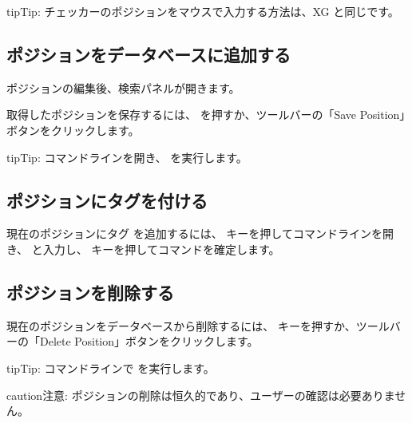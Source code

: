 \documentclass[letterpaper,10pt,dvipdfmx]{sphinxmanual}
\begin{document}
\begin{sphinxadmonition}{tip}{Tip:}
\sphinxAtStartPar
チェッカーのポジションをマウスで入力する方法は、XG と同じです。
\end{sphinxadmonition}


\subsection{ポジションをデータベースに追加する}
\label{\detokenize{guide_utilisateur:ajouter-une-position-a-la-base-de-donnees}}
\sphinxAtStartPar
ポジションの編集後、検索パネルが開きます。

\sphinxAtStartPar
取得したポジションを保存するには、 を押すか、ツールバーの「Save Position」ボタンをクリックします。

\begin{sphinxadmonition}{tip}{Tip:}
\sphinxAtStartPar
コマンドラインを開き、 を実行します。
\end{sphinxadmonition}


\subsection{ポジションにタグを付ける}
\label{\detokenize{guide_utilisateur:etiqueter-une-position}}
\sphinxAtStartPar
現在のポジションにタグ  を追加するには、 キーを押してコマンドラインを開き、 と入力し、 キーを押してコマンドを確定します。


\subsection{ポジションを削除する}
\label{\detokenize{guide_utilisateur:supprimer-une-position}}
\sphinxAtStartPar
現在のポジションをデータベースから削除するには、 キーを押すか、ツールバーの「Delete Position」ボタンをクリックします。

\begin{sphinxadmonition}{tip}{Tip:}
\sphinxAtStartPar
コマンドラインで  を実行します。
\end{sphinxadmonition}

\begin{sphinxadmonition}{caution}{注意:}
\sphinxAtStartPar
ポジションの削除は恒久的であり、ユーザーの確認は必要ありません。
\end{sphinxadmonition}
\end{document}
